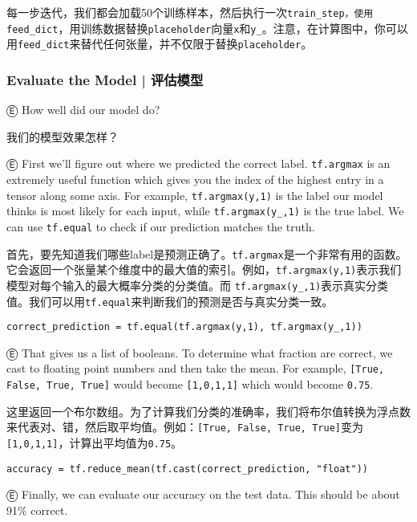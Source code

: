 每一步迭代，我们都会加载50个训练样本，然后执行一次\lstinline{train_step，使用}\lstinline{feed_dict}，用训练数据替换\lstinline{placeholder}向量\lstinline{x}和\lstinline{y_}。注意，在计算图中，你可以用\lstinline{feed_dict}来替代任何张量，并不仅限于替换\lstinline{placeholder}。

\subsubsection{Evaluate the Model  |  评估模型}

Ⓔ \textcolor{etc}{How well did our model do?}

我们的模型效果怎样？

Ⓔ \textcolor{etc}{First we'll figure out where we predicted the correct label. \lstinline{tf.argmax} is an extremely useful function which gives you the index of the highest entry in a tensor along some axis. For example, \lstinline{tf.argmax(y,1)} is the label our model thinks is most likely for each input, while \lstinline{tf.argmax(y_,1)} is the true label. We can use \lstinline{tf.equal} to check if our prediction matches the truth.}

首先，要先知道我们哪些label是预测正确了。\lstinline{tf.argmax}是一个非常有用的函数。它会返回一个张量某个维度中的最大值的索引。例如，\lstinline{tf.argmax(y,1)}表示我们模型对每个输入的最大概率分类的分类值。而 \lstinline{tf.argmax(y_,1)}表示真实分类值。我们可以用\lstinline{tf.equal}来判断我们的预测是否与真实分类一致。

\begin{lstlisting}
correct_prediction = tf.equal(tf.argmax(y,1), tf.argmax(y_,1))
\end{lstlisting}

Ⓔ \textcolor{etc}{That gives us a list of booleans. To determine what fraction are correct, we cast to floating point numbers and then take the mean. For example, \lstinline{[True, False, True, True]} would become \lstinline{[1,0,1,1]} which would become \lstinline{0.75}.}

这里返回一个布尔数组。为了计算我们分类的准确率，我们将布尔值转换为浮点数来代表对、错，然后取平均值。例如：\lstinline{[True, False, True, True]}变为\lstinline{[1,0,1,1]}，计算出平均值为\lstinline{0.75}。

\begin{lstlisting}
accuracy = tf.reduce_mean(tf.cast(correct_prediction, "float"))
\end{lstlisting}

Ⓔ \textcolor{etc}{Finally, we can evaluate our accuracy on the test data. This should be about 91\% correct.}

